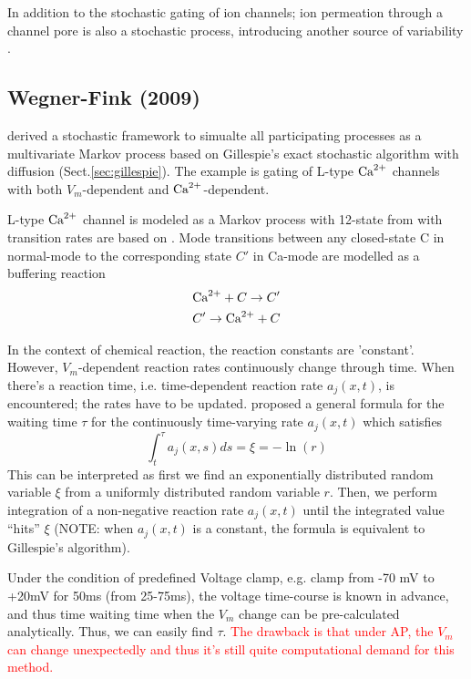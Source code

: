 In addition to the stochastic gating of ion channels; ion permeation
through a channel pore is also a stochastic process, introducing another source of
variability \citep{kuyucak2001, krishnamurthy2007,krishnamurthy2011}.


\subsection{Wegner-Fink (2009)}
\label{sec:wegner_2009_stochastic}

\citep{wegner2009}  derived a stochastic framework to simualte all participating
processes as a multivariate Markov process based on Gillespie's exact stochastic
algorithm with diffusion (Sect.\ref{sec:gillespie}). The example is gating of
L-type ${\text{Ca}^{2+}}$ channels with both $V_m$-dependent and ${\text{Ca}^{2+}}$-dependent.

L-type ${\text{Ca}^{2+}}$ channel is modeled as a Markov process with 12-state from
\citep{jafri1998cad, greenstein2002} with transition rates are based on
\citep{greenstein2002}. Mode transitions between any closed-state C in normal-mode to the
corresponding state $C'$ in Ca-mode are modelled as a buffering reaction
\begin{equation}
\begin{split}
{\text{Ca}^{2+}} + C \rightarrow C' \\
C' \rightarrow {\text{Ca}^{2+}} + C
\end{split}
\end{equation}
 
In the context of chemical reaction, the reaction constants are 'constant'.
However, $V_m$-dependent reaction rates continuously change through time.
When there's a reaction time, i.e. time-dependent reaction rate $a_j(x,t)$, is
encountered; the rates have to be updated. \citep{wegner2009}  proposed a
general formula for the waiting time $\tau$ for the continuously time-varying
rate $a_j(x,t)$ which satisfies
\begin{equation}
\label{eq:1666}
\int_t^\tau a_j(x,s) ds = \xi= -\ln(r)
\end{equation}
This can be interpreted as first we find an exponentially distributed random
variable $\xi$ from a uniformly distributed random variable $r$. Then,  we
perform integration of a non-negative reaction rate $a_j(x,t)$ until the
integrated value ``hits'' $\xi$ (NOTE: when $a_j(x,t)$ is a constant, the
formula is equivalent to Gillespie's algorithm).

Under the condition of predefined Voltage clamp, e.g. clamp from -70 mV to +20mV
for 50ms (from 25-75ms), the voltage time-course is known in advance, and thus
time waiting time when the $V_m$ change can be pre-calculated analytically.
Thus, we can easily find $\tau$. \textcolor{red}{The drawback is that under AP,
the $V_m$ can change unexpectedly and thus it's still quite computational
demand for this method.}

